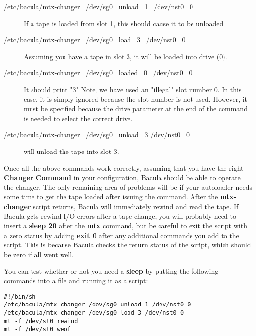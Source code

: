 \begin{description}
\item [/etc/bacula/mtx-changer \ /dev/sg0 \ unload \ 1 \ /dev/nst0 \ 0 ]

   If a tape is loaded from slot 1, this should cause it to be unloaded.  

\item [/etc/bacula/mtx-changer \ /dev/sg0 \ load \ 3 \ /dev/nst0 \ 0 ]

Assuming you have a tape in slot 3,  it will be loaded into drive (0).
 

\item [/etc/bacula/mtx-changer \ /dev/sg0 \ loaded \ 0 \ /dev/nst0 \ 0]

It should print "3"  
Note, we have used an "illegal" slot number 0. In this case, it is simply
ignored because the slot number is not used.  However, it must be specified
because the drive parameter at the end of the command is needed to select
the correct drive.

\item [/etc/bacula/mtx-changer \ /dev/sg0 \ unload \ 3 /dev/nst0 \ 0]

will unload the tape into slot 3.

\end{description}

Once all the above commands work correctly, assuming that you have the right
{\bf Changer Command} in your configuration, Bacula should be able to operate
the changer. The only remaining area of problems will be if your autoloader
needs some time to get the tape loaded after issuing the command. After the
{\bf mtx-changer} script returns, Bacula will immediately rewind and read the
tape. If Bacula gets rewind I/O errors after a tape change, you will probably
need to insert a {\bf sleep 20} after the {\bf mtx} command, but be careful to
exit the script with a zero status by adding {\bf exit 0} after any additional
commands you add to the script. This is because Bacula checks the return
status of the script, which should be zero if all went well. 

You can test whether or not you need a {\bf sleep} by putting the following
commands into a file and running it as a script: 

\footnotesize
\begin{verbatim}
#!/bin/sh
/etc/bacula/mtx-changer /dev/sg0 unload 1 /dev/nst0 0
/etc/bacula/mtx-changer /dev/sg0 load 3 /dev/nst0 0
mt -f /dev/st0 rewind
mt -f /dev/st0 weof
\end{verbatim}
\normalsize

